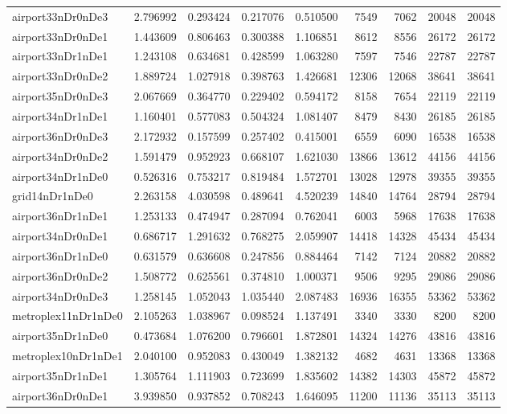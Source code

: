 \begin{longtable}{|l|r|r|r|r|r|r|r|r|}
airport33nDr0nDe3 & 2.796992 & 0.293424 & 0.217076 & 0.510500 & 7549 & 7062 & 20048 & 20048 \\
airport33nDr0nDe1 & 1.443609 & 0.806463 & 0.300388 & 1.106851 & 8612 & 8556 & 26172 & 26172 \\
airport33nDr1nDe1 & 1.243108 & 0.634681 & 0.428599 & 1.063280 & 7597 & 7546 & 22787 & 22787 \\
airport33nDr0nDe2 & 1.889724 & 1.027918 & 0.398763 & 1.426681 & 12306 & 12068 & 38641 & 38641 \\
airport35nDr0nDe3 & 2.067669 & 0.364770 & 0.229402 & 0.594172 & 8158 & 7654 & 22119 & 22119 \\
airport34nDr1nDe1 & 1.160401 & 0.577083 & 0.504324 & 1.081407 & 8479 & 8430 & 26185 & 26185 \\
airport36nDr0nDe3 & 2.172932 & 0.157599 & 0.257402 & 0.415001 & 6559 & 6090 & 16538 & 16538 \\
airport34nDr0nDe2 & 1.591479 & 0.952923 & 0.668107 & 1.621030 & 13866 & 13612 & 44156 & 44156 \\
airport34nDr1nDe0 & 0.526316 & 0.753217 & 0.819484 & 1.572701 & 13028 & 12978 & 39355 & 39355 \\
grid14nDr1nDe0 & 2.263158 & 4.030598 & 0.489641 & 4.520239 & 14840 & 14764 & 28794 & 28794 \\
airport36nDr1nDe1 & 1.253133 & 0.474947 & 0.287094 & 0.762041 & 6003 & 5968 & 17638 & 17638 \\
airport34nDr0nDe1 & 0.686717 & 1.291632 & 0.768275 & 2.059907 & 14418 & 14328 & 45434 & 45434 \\
airport36nDr1nDe0 & 0.631579 & 0.636608 & 0.247856 & 0.884464 & 7142 & 7124 & 20882 & 20882 \\
airport36nDr0nDe2 & 1.508772 & 0.625561 & 0.374810 & 1.000371 & 9506 & 9295 & 29086 & 29086 \\
airport34nDr0nDe3 & 1.258145 & 1.052043 & 1.035440 & 2.087483 & 16936 & 16355 & 53362 & 53362 \\
metroplex11nDr1nDe0 & 2.105263 & 1.038967 & 0.098524 & 1.137491 & 3340 & 3330 & 8200 & 8200 \\
airport35nDr1nDe0 & 0.473684 & 1.076200 & 0.796601 & 1.872801 & 14324 & 14276 & 43816 & 43816 \\
metroplex10nDr1nDe1 & 2.040100 & 0.952083 & 0.430049 & 1.382132 & 4682 & 4631 & 13368 & 13368 \\
airport35nDr1nDe1 & 1.305764 & 1.111903 & 0.723699 & 1.835602 & 14382 & 14303 & 45872 & 45872 \\
airport36nDr0nDe1 & 3.939850 & 0.937852 & 0.708243 & 1.646095 & 11200 & 11136 & 35113 & 35113 \\

\end{longtable}
